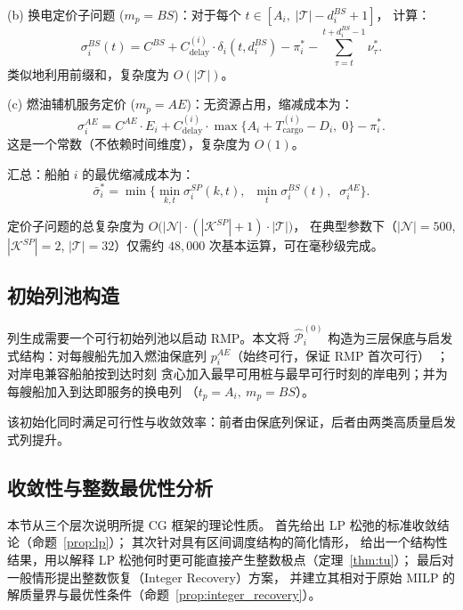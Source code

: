 \documentclass[UTF8, a4paper, 12pt]{ctexart}
\theoremstyle{plain}
\theoremstyle{definition}
\theoremstyle{remark}
\begin{document}
\medskip
\noindent(b) 换电定价子问题
($m_p = BS$)：对于每个 $t \in [A_i,\; |\mathcal{T}| - d_i^{BS} + 1]$，
计算：
\begin{equation}
  \sigma_i^{BS}(t)
  = C^{BS} + C_{\text{delay}}^{(i)} \cdot \delta_i(t, d_i^{BS})
  - \pi_i^*
  - \sum_{\tau = t}^{t + d_i^{BS} - 1} \nu_{\tau}^*.
  \label{eq:price_bs}
\end{equation}
类似地利用前缀和，复杂度为 $O(|\mathcal{T}|)$。

\medskip
\noindent(c) 燃油辅机服务定价
($m_p = AE$)：无资源占用，缩减成本为：
\begin{equation}
  \sigma_i^{AE}
  = C^{AE} \cdot E_i
  + C_{\text{delay}}^{(i)} \cdot \max\!\big\{A_i + T_{\text{cargo}}^{(i)} - D_i,\; 0\big\}
  - \pi_i^*.
  \label{eq:price_ae}
\end{equation}
这是一个常数（不依赖时间维度），复杂度为 $O(1)$。

\medskip
\noindent 汇总：船舶 $i$ 的最优缩减成本为：
\begin{equation}
  \bar{\sigma}_i^* = \min\!\Big\{
    \min_{k,t} \sigma_i^{SP}(k,t),\;\;
    \min_{t} \sigma_i^{BS}(t),\;\;
    \sigma_i^{AE}
  \Big\}.
  \label{eq:price_min}
\end{equation}

\noindent
定价子问题的总复杂度为
$O\!\big(|\mathcal{N}| \cdot (|\mathcal{K}^{SP}| + 1) \cdot |\mathcal{T}|\big)$，
在典型参数下（$|\mathcal{N}| = 500$, $|\mathcal{K}^{SP}| = 2$,
$|\mathcal{T}| = 32$）仅需约 $48{,}000$ 次基本运算，可在毫秒级完成。

\subsection{初始列池构造}
\label{sec:cg_init}

列生成需要一个可行初始列池以启动 RMP。本文将
$\hat{\mathcal{P}}_i^{(0)}$ 构造为三层保底与启发式结构：对每艘船先加入燃油保底列
$p_i^{AE}$（始终可行，保证 RMP 首次可行）~\cite{Cordeau2015}；对岸电兼容船舶按到达时刻
贪心加入最早可用桩与最早可行时刻的岸电列；并为每艘船加入到达即服务的换电列
（$t_p=A_i,\ m_p=BS$）。

\noindent
该初始化同时满足可行性与收敛效率：前者由保底列保证，后者由两类高质量启发式列提升。

\subsection{收敛性与整数最优性分析}
\label{sec:cg_convergence}

本节从三个层次说明所提 CG 框架的理论性质。
首先给出 LP 松弛的标准收敛结论（命题~\ref{prop:lp}）；
其次针对具有区间调度结构的简化情形，
给出一个结构性结果，用以解释 LP 松弛何时更可能直接产生整数极点（定理~\ref{thm:tu}）；
最后对一般情形提出整数恢复（Integer Recovery）方案，
并建立其相对于原始 MILP 的解质量界与最优性条件（命题~\ref{prop:integer_recovery}）。
\end{document}
